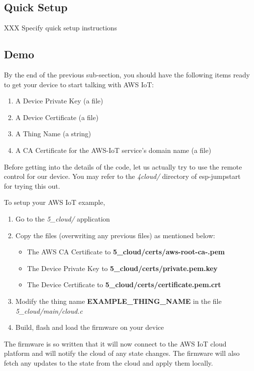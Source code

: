 \documentclass[main.tex]{subfiles}
\begin{document}
\subsection{Quick Setup}
XXX Specify quick setup instructions

\subsection{Demo}
By the end of the previous sub-section, you should have the following items ready to get your device to start talking with AWS IoT:
\begin{enumerate}
    \item A Device Private Key (a file)
    \item A Device Certificate (a file)
    \item A Thing Name (a string)
    \item A CA Certificate for the AWS-IoT service's domain name (a file)
\end{enumerate}

Before getting into the details of the code, let us actually try to use the remote control for our device.
You may refer to the \textit{4cloud/} directory of esp-jumpstart for trying this out.

To setup your AWS IoT example, 
\begin{enumerate}
    \item Go to the \textit{5\_cloud/} application
    \item Copy the files (overwriting any previous files) as mentioned below:
    \begin{itemize}
        \item The AWS CA Certificate to \textbf{5\_cloud/certs/aws-root-ca-.pem}
        \item The Device Private Key to \textbf{5\_cloud/certs/private.pem.key}
        \item The Device Certificate to \textbf{5\_cloud/certs/certificate.pem.crt}
    \end{itemize}
    \item Modify the thing name \textbf{EXAMPLE\_THING\_NAME} in the file \textit{5\_cloud/main/cloud.c}
    \item Build, flash and load the firmware on your device
\end{enumerate}

The firmware is so written that it will now connect to the AWS IoT cloud platform and will notify the cloud of any state changes. The firmware will also fetch any updates to the state from the cloud and apply them locally. 
\end{document}
